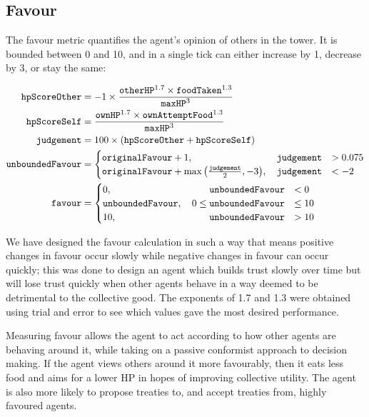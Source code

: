 \subsection*{Favour}\label{sec:team5-favour}
The favour metric quantifies the agent's opinion of others in the tower. It is bounded between 0 and 10, and in a single tick can either increase by 1, decrease by 3, or stay the same:

\begin{align*}
    \texttt{hpScoreOther} &= -1 \times \frac{\texttt{otherHP}^{1.7} \times \texttt{foodTaken}^{1.3}}{\texttt{maxHP}^3}\\
    \texttt{hpScoreSelf} &= \frac{\texttt{ownHP}^{1.7}\times\texttt{ownAttemptFood}^{1.3}}{\texttt{maxHP}^3}\\
    \texttt{judgement} &= 100 \times (\texttt{hpScoreOther} + \texttt{hpScoreSelf})\\
    \texttt{unboundedFavour} &= \begin{cases}
        \texttt{originalFavour} + 1, \quad\hfill \texttt{judgement} &> 0.075\\
        \texttt{originalFavour} + \max{\left(\frac{\texttt{judgement}}{2}, -3\right)}, \quad\hfill\texttt{judgement} &< -2
    \end{cases}\\
    \texttt{favour} &= \begin{cases}
        0, \quad\hfill \texttt{unboundedFavour} &< 0\\
        \texttt{unboundedFavour}, \quad 0 \leq \texttt{unboundedFavour} &\leq 10\\
        10, \quad\hfill \texttt{unboundedFavour} &> 10
    \end{cases}\\
\end{align*}

We have designed the favour calculation in such a way that means positive changes in favour occur slowly while negative changes in favour can occur quickly; this was done to design an agent which builds trust slowly over time but will lose trust quickly when other agents behave in a way deemed to be detrimental to the collective good. The exponents of 1.7 and 1.3 were obtained using trial and error to see which values gave the most desired performance.

Measuring favour allows the agent to act according to how other agents are behaving around it, while taking on a passive conformist approach to decision making. If the agent views others around it more favourably, then it eats less food and aims for a lower HP in hopes of improving collective utility. The agent is also more likely to propose treaties to, and accept treaties from, highly favoured agents.

